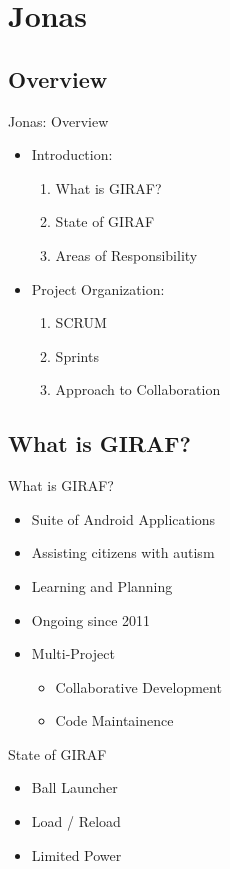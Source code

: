 \section{Jonas}
\subsection{Overview}
\begin{frame}{Jonas: Overview}
\begin{itemize}
	\item Introduction:
  		\begin{enumerate}
			\item What is GIRAF?
			\item State of GIRAF
			\item Areas of Responsibility
		\end{enumerate}
	\item Project Organization:
		\begin{enumerate}
			\item SCRUM
			\item Sprints
			\item Approach to Collaboration
		\end{enumerate}
\end{itemize}
\end{frame}

\subsection{What is GIRAF?}
\begin{frame}{What is GIRAF?}
\begin{itemize}
	\item Suite of Android Applications
	\item Assisting citizens with autism
	\item Learning and Planning
	\item Ongoing since 2011
	\item Multi-Project
		\begin{itemize}
		    \item Collaborative Development 
  			\item Code Maintainence
		\end{itemize}
\end{itemize}
\end{frame}

\begin{frame}{State of GIRAF}

\begin{itemize}
	\item Ball Launcher
	\item Load / Reload
	\item Limited Power
\end{itemize}
\end{frame}